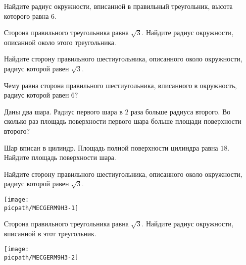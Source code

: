 \begin{class}[number=7]
	\begin{listofex}
		\item Найдите радиус окружности, вписанной в правильный треугольник, высота которого равна \(6\).
		\item Сторона правильного треугольника равна \(\sqrt{3}\). Найдите радиус окружности, описанной около этого треугольника.
		\item Найдите сторону правильного шестиугольника, описанного около окружности, радиус которой равен \(\sqrt{3}\).
		\item Чему равна сторона правильного шестиугольника, вписанного в окружность, радиус которой равен \(6\)?
		\item Даны два шара. Радиус первого шара в \(2\) раза больше радиуса второго. Во сколько раз площадь поверхности первого шара больше площади поверхности второго?
		\item Шар вписан в цилиндр. Площадь полной поверхности цилиндра равна \(18\). Найдите площадь поверхности шара.
		
		\item
		\begin{minipage}[t]{\bodywidth}
			Найдите сторону правильного шестиугольника, описанного около окружности, радиус которой равен \(\sqrt{3}\).
		\end{minipage}
		\hspace{0.02\linewidth}
		\begin{minipage}[t]{\picwidth}
			\texttt{[image: \\picpath/MECGERM9H3-1]}
		\end{minipage}
		\item
		\begin{minipage}[t]{\bodywidth}
			Сторона правильного треугольника равна \(\sqrt{3}\). Найдите радиус окружности, вписанной в этот треугольник.
		\end{minipage}
		\hspace{0.02\linewidth}
		\begin{minipage}[t]{\picwidth}
			\texttt{[image: \\picpath/MECGERM9H3-2]}
		\end{minipage}
		

\end{listofex}
\end{class}
